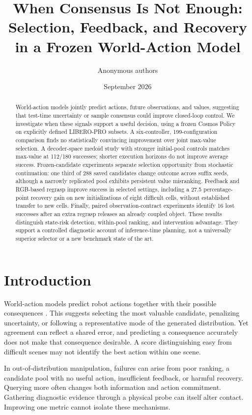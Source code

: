 \documentclass{article}
\title{When Consensus Is Not Enough:\\Selection, Feedback, and Recovery\\in a Frozen World-Action Model}
\author{Anonymous authors}
\date{September 2026}
\begin{document}
\maketitle
\begin{abstract}
World-action models jointly predict actions, future observations, and values,
suggesting that test-time uncertainty or sample consensus could improve
closed-loop control. We investigate when these signals support a useful
decision, using a frozen Cosmos Policy on explicitly defined LIBERO-PRO
subsets. A six-controller, 199-configuration comparison finds no statistically
convincing improvement over joint max-value selection. A decoder-space medoid
study with stronger initial-pool controls matches max-value at 112/180
successes; shorter execution horizons do not improve average success.
Frozen-candidate experiments separate selection opportunity from stochastic
continuation: one third of 288 saved candidates change outcome across suffix
seeds, although a narrowly replicated pool exhibits persistent value
misranking. Feedback and RGB-based regrasp improve success in selected settings,
including a 27.5 percentage-point recovery gain on new initializations of
eight difficult cells, without established transfer to new cells. Finally,
paired observation-contract experiments identify 16 lost successes after
an extra regrasp releases an already coupled object. These results distinguish
state-risk detection, within-pool ranking, and intervention advantage.
They support a controlled diagnostic account of inference-time planning,
not a universally superior selector or a new benchmark state of the art.
\end{abstract}

\section{Introduction}
World-action models predict robot actions together with their possible
consequences \citep{cosmos_policy}. This suggests selecting the most valuable
candidate, penalizing uncertainty, or following a representative mode of the
generated distribution. Yet agreement can reflect a shared error, and
predicting a consequence accurately does not make that consequence desirable.
A score distinguishing easy from difficult scenes may not identify the best
action within one scene.

In out-of-distribution manipulation, failures can arise from poor ranking,
a candidate pool with no useful action, insufficient feedback, or harmful
recovery. Querying more often changes both information and action commitment.
Gathering diagnostic evidence through a physical probe can itself alter
contact. Improving one metric cannot isolate these mechanisms.
\end{document}
